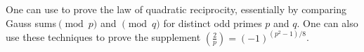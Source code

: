 \documentclass[../notes.tex]{subfiles}
\begin{document}
\begin{remark}
	One can use  to prove the law of quadratic reciprocity, essentially by comparing Gauss sums$\pmod p$ and $\pmod q$ for distinct odd primes $p$ and $q$. One can also use these techniques to prove the supplement $\left(\frac2p\right)=(-1)^{\left(p^2-1\right)/8}$.
\end{remark}
\end{document}
